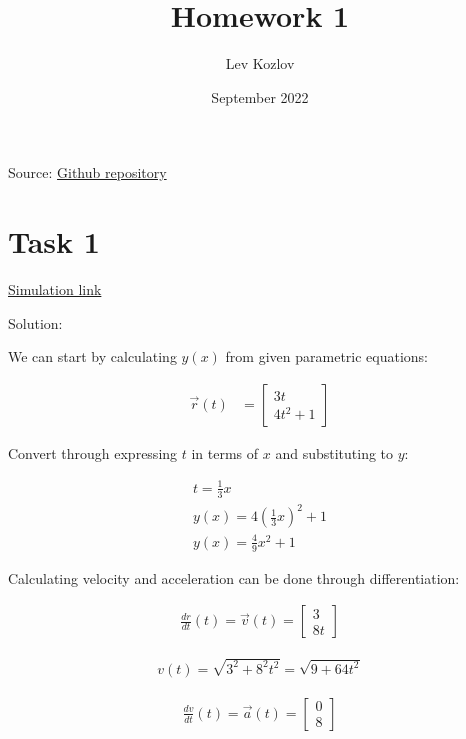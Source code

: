 \documentclass{article}
\title{Homework 1}
\author{Lev Kozlov}
\date{September 2022}
\begin{document}
\maketitle

Source: \href{https://github.com/lvjonok/f22-theoretical-mechanics/tree/master/homework1}{Github repository}

\section{Task 1}

\href{https://github.com/lvjonok/f22-theoretical-mechanics/blob/master/homework1/motion_task1.gif}{Simulation link}

Solution:

We can start by calculating $y(x)$ from given parametric equations:


\begin{align}
    \vec{r}(t) & = \begin{bmatrix}
        3t \\
        4t^2 + 1
    \end{bmatrix}
\end{align}

Convert through expressing $t$ in terms of $x$ and substituting to $y$:

\begin{align}
    t = \frac{1}{3}x                        \\
    y(x) = 4\left(\frac{1}{3}x\right)^2 + 1 \\
    y(x) = \frac{4}{9}x^2 + 1
\end{align}

Calculating velocity and acceleration can be done through differentiation:

\begin{align}
    \frac{dr}{dt}(t) = \vec{v}(t) = \begin{bmatrix}
        3 \\
        8t
    \end{bmatrix}
\end{align}

\begin{align}
    v(t) = \sqrt{3^2 + 8^2t^2} = \sqrt{9 + 64t^2}
\end{align}

\begin{align}
    \frac{dv}{dt}(t) = \vec{a}(t) = \begin{bmatrix}
        0 \\
        8
    \end{bmatrix}
\end{align}
\end{document}
